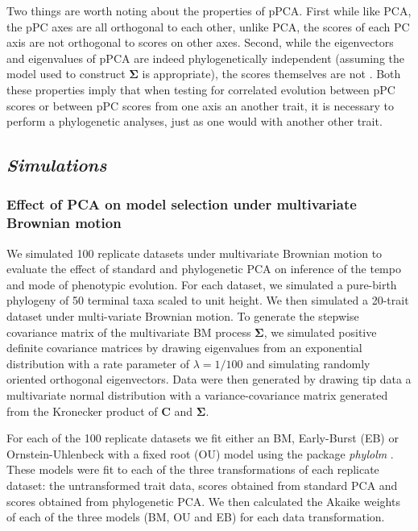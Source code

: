 \documentclass[a4paper,12pt]{article}
\begin{document}
Two things are worth noting about the properties of pPCA. First while like PCA, the pPC axes are all orthogonal to each other, unlike PCA, the scores of each PC axis are not orthogonal to scores on other axes. Second, while the eigenvectors and eigenvalues of pPCA are indeed phylogenetically independent (assuming the model used to construct $\mathbf{\Sigma}$ is appropriate), the scores themselves are not \citep{Revell2008, Polly2013}. Both these properties imply that when testing for correlated evolution between pPC scores or between pPC scores from one axis an another trait, it is necessary to perform a phylogenetic analyses, just as one would with another other trait.  


\subsection{\emph{Simulations}}
\subsubsection{Effect of PCA on model selection under multivariate Brownian motion}
We simulated 100 replicate datasets under multivariate Brownian motion to evaluate the effect of standard and phylogenetic PCA on inference of the tempo and mode of phenotypic evolution. For each dataset, we simulated a pure-birth phylogeny of 50 terminal taxa scaled to unit height. We then simulated a 20-trait dataset under multi-variate Brownian motion. To generate the stepwise covariance matrix of the multivariate BM process $\mathbf{\Sigma}$, we simulated positive definite covariance matrices by drawing eigenvalues from an exponential distribution with a rate parameter of $\lambda = 1/100$ and simulating randomly oriented orthogonal eigenvectors. Data were then generated by drawing tip data a multivariate normal distribution with a variance-covariance matrix generated from the Kronecker product of $\mathbf{C}$ and $\mathbf{\Sigma}$.

For each of the 100 replicate datasets we fit either an BM, Early-Burst (EB) or Ornstein-Uhlenbeck with a fixed root (OU) model using the package \textit{phylolm} \citep{HoandAne2014}. These models were fit to each of the three transformations of each replicate dataset: the untransformed trait data, scores obtained from standard PCA and scores obtained from phylogenetic PCA. We then calculated the Akaike weights of each of the three models (BM, OU and EB) for each data transformation. 
\end{document}
